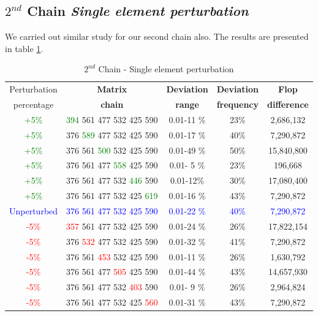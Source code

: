 \documentclass[10pts]{article}
\begin{document}
 \subsection*{$2^{nd}$ Chain \hspace{5pt} \textit{Single element perturbation}}
 We carried out similar study for our second chain also. The results are presented in table \ref{table:$2^{nd}$ Chain - Single element perturbation}.
 \begin{table}[htp!]
 	\centering
 	\begin{tabular}{| c|c | c |c | c |}
 		\hline
 		Perturbation&\textbf{Matrix} & \textbf{Deviation} & \textbf{Deviation} & \textbf{Flop }\\
 		percentage&\textbf{chain}& \textbf{range}&\textbf{frequency}&\textbf{difference}\\
 		\hline
 		\textcolor{green}{+5\%}&\textcolor{green}{394} 561 477 532 425 590	&	0.01-11 \%	 &		23\%	&		2,686,132\\
 		\textcolor{green}{+5\%}&376 	\textcolor{green}{589} 477 532 425 590	&	0.01-17 \%	 &		40\%	&		7,290,872\\	
 		\textcolor{green}{+5\%}&376 561 	\textcolor{green}{500} 532 425 590	&	0.01-49 \%	 &		50\%	&		15,840,800\\	
 		\textcolor{green}{+5\%} &376 561 477 	\textcolor{green}{558} 425 590	&	0.01- 5 \%	 &		23\%	&		   196,668\\
 		\textcolor{green}{+5\%} &376 561 477 532 	\textcolor{green}{446} 590	&	0.01-12\%	 &		30\%	&		17,080,400\\
 		\textcolor{green}{+5\%}&376 561 477 532 425 	\textcolor{green}{619}	&	0.01-16 \%	&		43\%	&		7,290,872\\
 			\textcolor{blue}{Unperturbed}&\textcolor{blue}{376} \textcolor{blue}{561} \textcolor{blue}{477} \textcolor{blue}{532} \textcolor{blue}{425} \textcolor{blue}{590}	&	\textcolor{blue}{0.01-22 \%}	&		\textcolor{blue}{40\%}	&		\textcolor{blue}{7,290,872}\\
 		\textcolor{red}{-5\%} &\textcolor{red}{357} 561 477 532 425 590	  &  	0.01-24 \%		&	26\%		&	17,822,154\\
 		\textcolor{red}{-5\%} &376 	\textcolor{red}{532} 477 532 425 590	  &	    0.01-32 \%		&	41\%		&	7,290,872	\\
 		\textcolor{red}{-5\%} &376 561 	\textcolor{red}{453} 532 425 590	  &	    0.01-11 \%		&	26\%		&	1,630,792	\\
 		\textcolor{red}{-5\%} &376 561 477 	\textcolor{red}{505} 425 590	  &	    0.01-44 \%		&	43\%		&	14,657,930\\
 		\textcolor{red}{-5\%} &376 561 477 532 	\textcolor{red}{403} 590	  &	    0.01- 9 \%		&	26\%		&	2,964,824\\
 		\textcolor{red}{-5\%} &376 561 477 532 425 	\textcolor{red}{560}	  &	    0.01-31 \%		&	43\%		&	7,290,872\\
 		\hline
 	\end{tabular}	
 	\caption{$2^{nd}$ Chain - Single element perturbation}
 	\label{table:$2^{nd}$ Chain - Single element perturbation}
 \end{table} 
         
\end{document}
